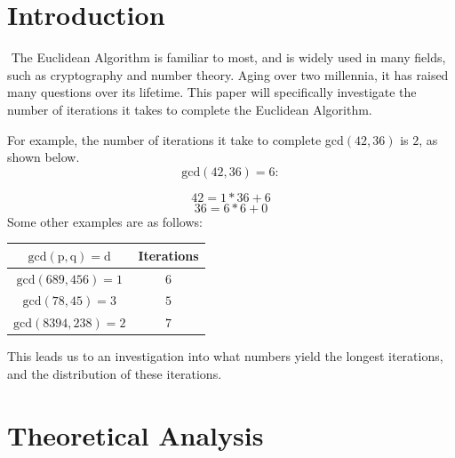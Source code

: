 \documentclass[11pt]{article}
\begin{document}
\tableofcontents
\newpage
\newpage

\section{Introduction}
$ $ \indent The Euclidean Algorithm is familiar to most, and is widely used in many fields, such as cryptography and number theory. Aging over two millennia, it has raised many questions over its lifetime. This paper will specifically investigate the number of iterations it takes to complete the Euclidean Algorithm. 

For example, the number of iterations it take to complete gcd$(42,36)$ is $2$, as shown below.
		$$\mathrm{gcd}(42,36) = 6:$$

	\begin{equation}
		42 = 1 * 36 + 6
	\end{equation}
	\begin{equation}
		36 = 6 * 6 + 0
	\end{equation}
Some other examples are as follows:

\begin{center}
\begin{tabular}{c|c}

$\mathrm{gcd}(\mathrm{p},\mathrm{q}) = \mathrm{d}$ & Iterations
\\
\hline
$\mathrm{gcd}(689,456) = 1$ & $6$\\

$\mathrm{gcd}(78,45) = 3$ & $5$\\

$\mathrm{gcd}(8394,238) = 2$ & $7$\\


\end{tabular}
\end{center}




This leads us to an investigation into what numbers yield the longest iterations, and the distribution of these iterations.


\section{Theoretical Analysis}$ $
\end{document}
